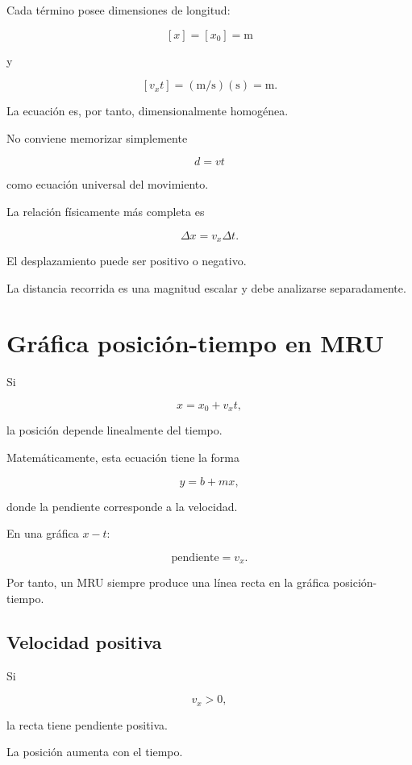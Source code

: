 Cada término posee dimensiones de longitud:

\[
[x]=[x_0]=\si{\meter}
\]

y

\[
[v_xt]
=
\left(\si{\meter\per\second}\right)
(\si{\second})
=
\si{\meter}.
\]

La ecuación es, por tanto, dimensionalmente homogénea.


\begin{advertencia}
No conviene memorizar simplemente

\[ d=vt \]

como ecuación universal del movimiento.

La relación físicamente más completa es

\[ \Delta x=v_x\Delta t. \]

El desplazamiento puede ser positivo o negativo.

La distancia recorrida es una magnitud escalar y debe analizarse
separadamente.
\end{advertencia}


\section{Gráfica posición-tiempo en MRU}

Si

\[ x=x_0+v_xt, \]

la posición depende linealmente del tiempo.

Matemáticamente, esta ecuación tiene la forma

\[ y=b+mx, \]

donde la pendiente corresponde a la velocidad.

En una gráfica \(x-t\):

\[
\boxed{\text{pendiente}=v_x}.
\]

Por tanto, un MRU siempre produce una línea recta en la gráfica
posición-tiempo.


\subsection{Velocidad positiva}

Si

\[ v_x>0, \]

la recta tiene pendiente positiva.

La posición aumenta con el tiempo.

